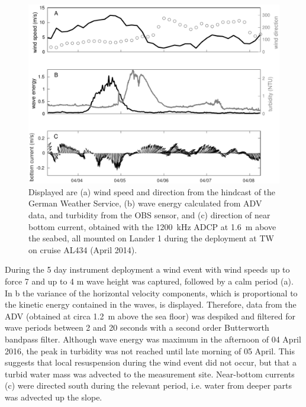  \begin{figure}[ht]
\includegraphics[width=15cm]{bilder/al434tw.pdf}
 \caption{Displayed are (a) wind speed and direction from the hindcast of the 
German Weather Service, (b) wave energy calculated from ADV data, and turbidity 
from the OBS sensor, and (c) direction of near bottom current, obtained with 
the 1200~kHz ADCP at 1.6~m above the seabed, all mounted on Lander 1 during the 
deployment at TW on cruise AL434 (April 2014).}
 \label{tromperwiek}
 \end{figure}
 
During the 5 day instrument deployment a wind event with wind 
speeds up to force 7 and up to 4 m wave height was captured, followed by a calm 
period (a). In b the variance of the 
horizontal velocity components, which is proportional to the kinetic energy 
contained in the waves, is displayed. Therefore, data from the ADV (obtained 
at circa 1.2~m above the sea floor) was despiked \citep[][]{goring2002} and 
filtered for wave periods between 2 and 20 seconds with a second order 
Butterworth bandpass filter. Although wave energy was maximum in the afternoon 
of 04 April 2016, the peak in turbidity was not reached until late morning of 
05 April. This suggests that local resuspension during the wind event did not 
occur, but that a turbid water mass was advected to the measurement site. 
Near-bottom currents (c) were directed south during the 
relevant period, i.e. water from deeper parts was advected up the slope.
\FloatBarrier
 
